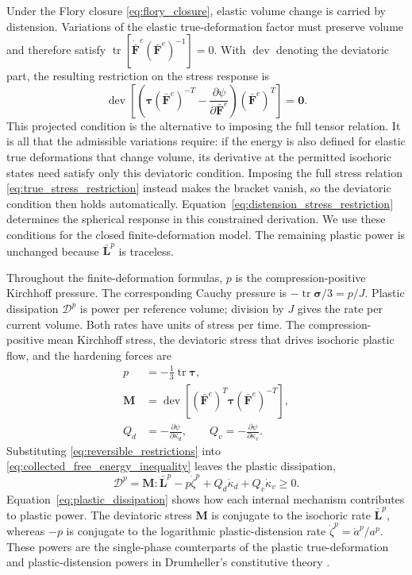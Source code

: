 \documentclass[11pt]{article}
\newcommand{\mbf}[1]{\mathbf{#1}}
\newcommand{\bs}[1]{\boldsymbol{#1}}
\newcommand{\dev}{\operatorname{dev}}
\newcommand{\tr}{\operatorname{tr}}
\begin{document}
Under the Flory closure \eqref{eq:flory_closure}, elastic volume change is
carried by distension. Variations of the elastic true-deformation factor must
preserve volume and therefore satisfy
\(\tr[\dot{\bar{\mbf F}}^e(\bar{\mbf F}^e)^{-1}]=0\).  With \(\dev\) denoting
the deviatoric part, the resulting restriction on the stress response is
\begin{equation}
	\dev\left[
		\left(
		\bs\tau(\bar{\mbf F}^{e})^{-T}
		-\frac{\partial\psi}{\partial\bar{\mbf F}^{e}}
		\right)(\bar{\mbf F}^{e})^T
		\right]=\mbf0.
 \label{eq:flory_projected_restriction}
\end{equation}
This projected condition is the alternative to imposing the full tensor
relation. It is all that the admissible variations require: if the energy is
also defined for elastic true deformations that change volume, its derivative
at the permitted isochoric states need satisfy only this deviatoric condition.
Imposing the full stress relation \eqref{eq:true_stress_restriction} instead
makes the bracket vanish, so the deviatoric condition then holds
automatically. Equation~\eqref{eq:distension_stress_restriction} determines the
spherical response in this constrained derivation. We use these conditions for
the closed finite-deformation model. The remaining plastic power is unchanged
because \(\bar{\mbf L}^{p}\) is traceless.

Throughout the finite-deformation formulas, \(p\) is the compression-positive
Kirchhoff pressure. The corresponding Cauchy pressure is
\(-\tr\bs\sigma/3=p/J\). Plastic dissipation
\(\mathcal D^p\) is power per reference volume; division by \(J\) gives the rate
per current volume. Both rates have units of stress per time.
The compression-positive mean Kirchhoff stress, the deviatoric stress that
drives isochoric plastic flow, and the hardening forces are
\begin{align*}
	p      & =-\frac{1}{3}\tr\bs\tau,
	\\
	\mbf M & =\dev\left[
		(\bar{\mbf F}^{e})^T\bs\tau
		(\bar{\mbf F}^{e})^{-T}
		\right],
	\\
	Q_d    & =-\frac{\partial\psi}{\partial\kappa_d},
	\qquad
	Q_v=-\frac{\partial\psi}{\partial\kappa_v}.
\end{align*}
Substituting \eqref{eq:reversible_restrictions} into
\eqref{eq:collected_free_energy_inequality} leaves the plastic dissipation,
\begin{equation}
	\mathcal D^p
	=\mbf M:\bar{\mbf L}^{p}
	-p\dot\zeta^p
	+Q_d\dot\kappa_d+Q_v\dot\kappa_v
	\ge0.
	\label{eq:plastic_dissipation}
\end{equation}
Equation~\eqref{eq:plastic_dissipation} shows how each internal mechanism
contributes to plastic power.  The deviatoric stress \(\mbf M\) is conjugate
to the isochoric rate \(\bar{\mbf L}^{p}\), whereas \(-p\) is conjugate to the
logarithmic plastic-distension rate
\(\dot\zeta^p=\dot a^p/a^p\).  These powers are the single-phase counterparts
of the plastic true-deformation and plastic-distension powers in Drumheller's constitutive
theory
\cite[eqs.~(108)--(112)]{drumheller2000}.
\end{document}
